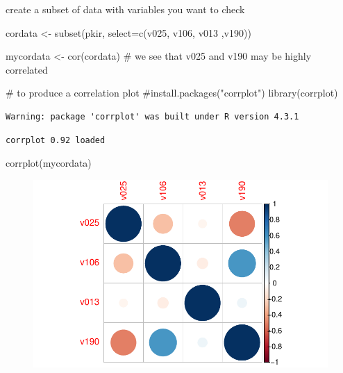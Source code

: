 \documentclass[
  letterpaper,
  DIV=11,
  numbers=noendperiod]{scrartcl}
\newenvironment{Shaded}{\begin{snugshade}}{\end{snugshade}}
\newcommand{\AttributeTok}[1]{\textcolor[rgb]{0.40,0.45,0.13}{#1}}
\newcommand{\CommentTok}[1]{\textcolor[rgb]{0.37,0.37,0.37}{#1}}
\newcommand{\FunctionTok}[1]{\textcolor[rgb]{0.28,0.35,0.67}{#1}}
\newcommand{\NormalTok}[1]{\textcolor[rgb]{0.00,0.23,0.31}{#1}}
\newcommand{\OtherTok}[1]{\textcolor[rgb]{0.00,0.23,0.31}{#1}}
\begin{document}
create a subset of data with variables you want to check

\begin{Shaded}
\begin{Highlighting}[]
\NormalTok{cordata }\OtherTok{\textless{}{-}} \FunctionTok{subset}\NormalTok{(pkir, }\AttributeTok{select=}\FunctionTok{c}\NormalTok{(v025, v106, v013 ,v190))}

\NormalTok{mycordata }\OtherTok{\textless{}{-}} \FunctionTok{cor}\NormalTok{(cordata)}
\CommentTok{\# we see that v025 and v190 may be highly correlated}

\CommentTok{\# to produce a correlation plot}
\CommentTok{\#install.packages("corrplot")}
\FunctionTok{library}\NormalTok{(corrplot)}
\end{Highlighting}
\end{Shaded}

\begin{verbatim}
Warning: package 'corrplot' was built under R version 4.3.1
\end{verbatim}

\begin{verbatim}
corrplot 0.92 loaded
\end{verbatim}

\begin{Shaded}
\begin{Highlighting}[]
\FunctionTok{corrplot}\NormalTok{(mycordata)}
\end{Highlighting}
\end{Shaded}

\begin{figure}[H]

{\centering \includegraphics{ir_files/figure-pdf/unnamed-chunk-11-1.pdf}

}

\end{figure}
\end{document}

